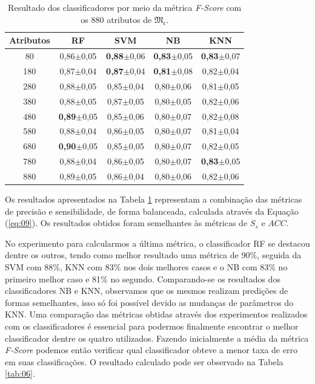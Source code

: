 \documentclass[a4paper]{ifacconf}
\begin{document}
\begin{table}[h]	
	\centering
	\caption{Resultado dos classificadores por meio da métrica \textit{F-Score} com os 880 atributos de $\mathfrak{M_c}$.}\label{tab:05}

		\begin{tabular}{ccccc}
	            \hline
			    \textbf{Atributos} & \textbf{RF} & \textbf{SVM} & \textbf{NB} & \textbf{KNN}\\
			\hline
			 80 & 0,86$\pm$0,05 & \textbf{0,88}$\pm$0,06 & \textbf{0,83}$\pm$0,05 & \textbf{0,83}$\pm$0,07 \\
			180 & 0,87$\pm$0,04 & \textbf{0,87}$\pm$0,04 & \textbf{0,81}$\pm$0,08 & 0,82$\pm$0,04 \\
			280 & 0,88$\pm$0,05 & 0,85$\pm$0,04 & 0,80$\pm$0,06 & 0,81$\pm$0,05 \\
			380 & 0,88$\pm$0,05 & 0,87$\pm$0,05 & 0,80$\pm$0,05 & 0,82$\pm$0,06 \\
			480 & \textbf{0,89}$\pm$0,05 & 0,85$\pm$0,06 & 0,80$\pm$0,07 & 0,82$\pm$0,08 \\
			580 & 0,88$\pm$0,04 & 0,86$\pm$0,05 & 0,80$\pm$0,07 & 0,81$\pm$0,04 \\
			680 & \textbf{0,90}$\pm$0,05 & 0,85$\pm$0,05 & 0,80$\pm$0,07 & 0,82$\pm$0,05 \\
			780 & 0,88$\pm$0,04 & 0,86$\pm$0,05 & 0,80$\pm$0,07 & \textbf{0,83}$\pm$0,05 \\
			880 & 0,89$\pm$0,05 & 0,86$\pm$0,04 & 0,80$\pm$0,06 & 0,82$\pm$0,06 \\
			\hline
		\end{tabular}
\end{table}

Os resultados apresentados na Tabela \ref{tab:05} representam a combinação das métricas de precisão e sensibilidade, de forma balanceada, calculada através da Equação (\ref{eq:09}). Os resultados obtidos foram semelhantes às métricas de $S_s$ e $ACC$.

No experimento para calcularmos a última métrica, o classificador RF se destacou dentre os outros, tendo como melhor resultado uma métrica de 90\%, seguida da SVM com 88\%, KNN com 83\% nos dois melhores casos e o NB com 83\% no primeiro melhor caso e 81\% no segundo.  Comparando-se os resultados dos classificadores NB e KNN, observamos que os mesmos realizam predições de formas semelhantes, isso só foi possível devido as mudanças de parâmetros do KNN. Uma comparação das métricas obtidas através dos experimentos realizados com os classificadores é essencial para podermos finalmente encontrar o melhor classificador dentre os quatro utilizados. Fazendo inicialmente a média da métrica \textit{F-Score} podemos então verificar qual classificador obteve a menor taxa de erro em suas classificações. O resultado calculado pode ser observado na Tabela \ref{tab:06}.
\end{document}
